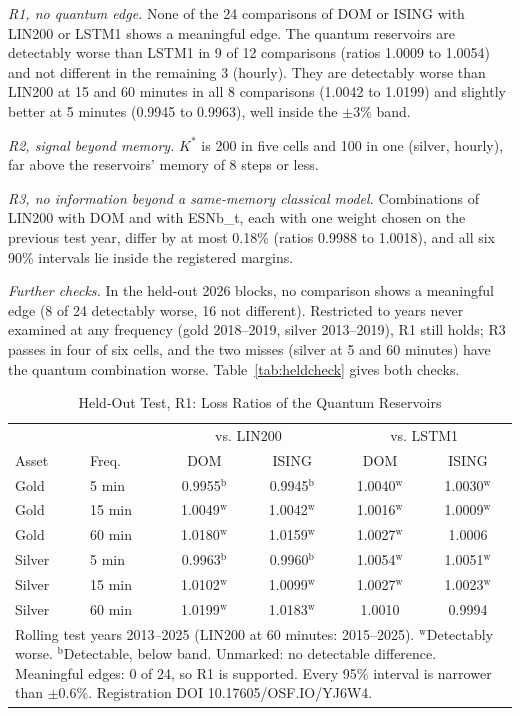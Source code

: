 \documentclass{ieeeaccess}
\begin{document}
\emph{R1, no quantum edge.} None of the 24 comparisons of DOM or ISING with LIN200 or LSTM1 shows a meaningful edge. The quantum reservoirs are detectably worse than LSTM1 in 9 of 12 comparisons (ratios 1.0009 to 1.0054) and not different in the remaining 3 (hourly). They are detectably worse than LIN200 at 15 and 60 minutes in all 8 comparisons (1.0042 to 1.0199) and slightly better at 5 minutes (0.9945 to 0.9963), well inside the $\pm3\%$ band.

\emph{R2, signal beyond memory.} $K^*$ is 200 in five cells and 100 in one (silver, hourly), far above the reservoirs' memory of 8 steps or less.

\emph{R3, no information beyond a same-memory classical model.} Combinations of LIN200 with DOM and with ESNb\_t, each with one weight chosen on the previous test year, differ by at most 0.18\% (ratios 0.9988 to 1.0018), and all six 90\% intervals lie inside the registered margins.

\emph{Further checks.} In the held-out 2026 blocks, no comparison shows a meaningful edge (8 of 24 detectably worse, 16 not different). Restricted to years never examined at any frequency (gold 2018--2019, silver 2013--2019), R1 still holds; R3 passes in four of six cells, and the two misses (silver at 5 and 60 minutes) have the quantum combination worse. Table~\ref{tab:heldcheck} gives both checks.

\begin{table}[t]
\caption{Held-Out Test, R1: Loss Ratios of the Quantum Reservoirs}
\label{tab:heldout}
\centering
\setlength{\tabcolsep}{3pt}
\begin{tabular}{llcccc}
\hline
& & \multicolumn{2}{c}{vs. LIN200} & \multicolumn{2}{c}{vs. LSTM1} \\
Asset & Freq. & DOM & ISING & DOM & ISING \\
\hline
Gold & 5 min & 0.9955$^\mathrm{b}$ & 0.9945$^\mathrm{b}$ & 1.0040$^\mathrm{w}$ & 1.0030$^\mathrm{w}$ \\
Gold & 15 min & 1.0049$^\mathrm{w}$ & 1.0042$^\mathrm{w}$ & 1.0016$^\mathrm{w}$ & 1.0009$^\mathrm{w}$ \\
Gold & 60 min & 1.0180$^\mathrm{w}$ & 1.0159$^\mathrm{w}$ & 1.0027$^\mathrm{w}$ & 1.0006 \\
Silver & 5 min & 0.9963$^\mathrm{b}$ & 0.9960$^\mathrm{b}$ & 1.0054$^\mathrm{w}$ & 1.0051$^\mathrm{w}$ \\
Silver & 15 min & 1.0102$^\mathrm{w}$ & 1.0099$^\mathrm{w}$ & 1.0027$^\mathrm{w}$ & 1.0023$^\mathrm{w}$ \\
Silver & 60 min & 1.0199$^\mathrm{w}$ & 1.0183$^\mathrm{w}$ & 1.0010 & 0.9994 \\
\hline
\multicolumn{6}{p{7.8cm}}{\footnotesize Rolling test years 2013--2025 (LIN200 at 60 minutes: 2015--2025). $^\mathrm{w}$Detectably worse. $^\mathrm{b}$Detectable, below band. Unmarked: no detectable difference. Meaningful edges: 0 of 24, so R1 is supported. Every 95\% interval is narrower than $\pm0.6\%$. Registration DOI 10.17605/OSF.IO/YJ6W4.}\\
\end{tabular}
\end{table}
\end{document}
